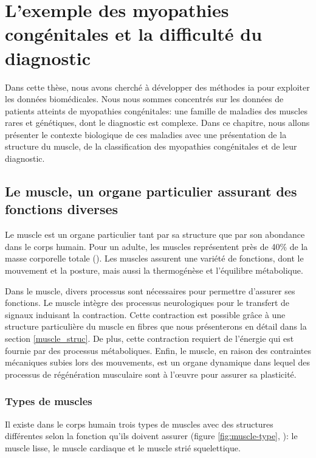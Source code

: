 \chapter{L’exemple des myopathies congénitales et la difficulté du diagnostic}
Dans cette thèse, nous avons cherché à développer des méthodes \gls{ia} pour exploiter les données biomédicales. Nous nous sommes concentrés sur les données de patients atteints de myopathies congénitales: une famille de maladies des muscles rares et génétiques, dont le diagnostic est complexe. Dans ce chapitre, nous allons présenter le contexte biologique de ces maladies avec une présentation de la structure du muscle, de la classification des myopathies congénitales et de leur diagnostic.

\section{Le muscle, un organe particulier assurant des fonctions diverses}
Le muscle est un organe particulier tant par sa structure que par son abondance dans le corps humain. Pour un adulte, les muscles représentent près de 40\% de la masse corporelle totale (\cite{janssen_skeletal_2000}). Les muscles assurent une variété de fonctions, dont le mouvement et la posture, mais aussi la thermogénèse et l'équilibre métabolique.

Dans le muscle, divers processus sont nécessaires pour permettre d'assurer ses fonctions. Le muscle intègre des processus neurologiques pour le transfert de signaux induisant la contraction. Cette contraction est possible grâce à une structure particulière du muscle en fibres que nous présenterons en détail dans la section \ref{muscle_struc}. De plus, cette contraction requiert de l'énergie qui est fournie par des processus métaboliques. Enfin, le muscle, en raison des contraintes mécaniques subies lors des mouvements, est un organe dynamique dans lequel des processus de régénération musculaire sont à l'œuvre pour assurer sa plasticité.

\subsection{Types de muscles}
Il existe dans le corps humain trois types de muscles avec des structures différentes selon la fonction qu'ils doivent assurer (figure \ref{fig:muscle-type}, \cite{gomez_oca_physiological_2021}): le muscle lisse, le muscle cardiaque et le muscle strié squelettique.

